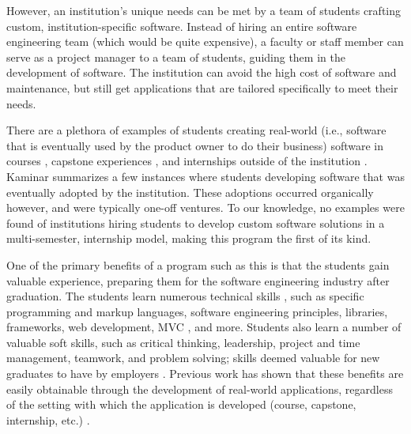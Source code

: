 However, an institution's unique needs can be met by a team of students crafting custom, institution-specific software. Instead of hiring an entire software engineering team (which would be quite expensive), a faculty or staff member can serve as a project manager to a team of students, guiding them in the development of software. The institution can avoid the high cost of software and maintenance, but still get applications that are tailored specifically to meet their needs.

There are a plethora of examples of students creating real-world (i.e., software that is eventually used by the product owner to do their business) software in courses \cite{coursevsproject, tadayon2004software}, capstone experiences \cite{keogh2007scalable, capstone}, and internships outside of the institution \cite{rochesterfirstundergradsoftwareteam}. Kaminar \cite{kaminer_2014} summarizes a few instances where students developing software that was eventually adopted by the institution. These adoptions occurred organically however, and were typically one-off ventures. To our knowledge, no examples were found of institutions hiring students to develop custom software solutions in a multi-semester, internship model, making this program the first of its kind.

One of the primary benefits of a program such as this is that the students gain valuable experience, preparing them for the software engineering industry after graduation. The students learn numerous technical skills \cite{hardskills}, such as specific programming and markup languages, software engineering principles, libraries, frameworks, web development, MVC \cite{mvc}, and more. Students also learn a number of valuable soft skills, such as critical thinking, leadership, project and time management, teamwork, and problem solving; skills deemed valuable for new graduates to have by employers \cite{lavy2013soft}. Previous work has shown that these benefits are easily obtainable through the development of real-world applications, regardless of the setting with which the application is developed (course, capstone, internship, etc.) \cite{heggen2018hiring, liu2005enriching, alzamil2005towards}.

